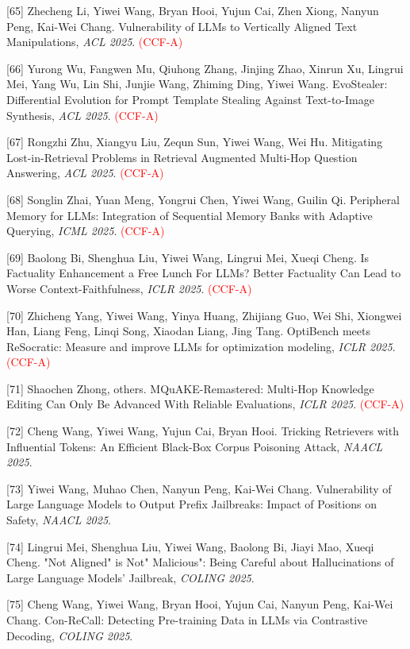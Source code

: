 [65] Zhecheng Li, Yiwei Wang, Bryan Hooi, Yujun Cai, Zhen Xiong, Nanyun Peng, Kai-Wei Chang. Vulnerability of LLMs to Vertically Aligned Text Manipulations, \textit{ACL 2025}. \textcolor{red}{(CCF-A)}

[66] Yurong Wu, Fangwen Mu, Qiuhong Zhang, Jinjing Zhao, Xinrun Xu, Lingrui Mei, Yang Wu, Lin Shi, Junjie Wang, Zhiming Ding, Yiwei Wang. EvoStealer: Differential Evolution for Prompt Template Stealing Against Text-to-Image Synthesis, \textit{ACL 2025}. \textcolor{red}{(CCF-A)}

[67] Rongzhi Zhu, Xiangyu Liu, Zequn Sun, Yiwei Wang, Wei Hu. Mitigating Lost-in-Retrieval Problems in Retrieval Augmented Multi-Hop Question Answering, \textit{ACL 2025}. \textcolor{red}{(CCF-A)}

[68] Songlin Zhai, Yuan Meng, Yongrui Chen, Yiwei Wang, Guilin Qi. Peripheral Memory for LLMs: Integration of Sequential Memory Banks with Adaptive Querying, \textit{ICML 2025}. \textcolor{red}{(CCF-A)}

[69] Baolong Bi, Shenghua Liu, Yiwei Wang, Lingrui Mei, Xueqi Cheng. Is Factuality Enhancement a Free Lunch For LLMs? Better Factuality Can Lead to Worse Context-Faithfulness, \textit{ICLR 2025}. \textcolor{red}{(CCF-A)}

[70] Zhicheng Yang, Yiwei Wang, Yinya Huang, Zhijiang Guo, Wei Shi, Xiongwei Han, Liang Feng, Linqi Song, Xiaodan Liang, Jing Tang. OptiBench meets ReSocratic: Measure and improve LLMs for optimization modeling, \textit{ICLR 2025}. \textcolor{red}{(CCF-A)}

[71] Shaochen Zhong, others. MQuAKE-Remastered: Multi-Hop Knowledge Editing Can Only Be Advanced With Reliable Evaluations, \textit{ICLR 2025}. \textcolor{red}{(CCF-A)}

[72] Cheng Wang, Yiwei Wang, Yujun Cai, Bryan Hooi. Tricking Retrievers with Influential Tokens: An Efficient Black-Box Corpus Poisoning Attack, \textit{NAACL 2025}.

[73] Yiwei Wang, Muhao Chen, Nanyun Peng, Kai-Wei Chang. Vulnerability of Large Language Models to Output Prefix Jailbreaks: Impact of Positions on Safety, \textit{NAACL 2025}.

[74] Lingrui Mei, Shenghua Liu, Yiwei Wang, Baolong Bi, Jiayi Mao, Xueqi Cheng. "Not Aligned" is Not" Malicious": Being Careful about Hallucinations of Large Language Models' Jailbreak, \textit{COLING 2025}.

[75] Cheng Wang, Yiwei Wang, Bryan Hooi, Yujun Cai, Nanyun Peng, Kai-Wei Chang. Con-ReCall: Detecting Pre-training Data in LLMs via Contrastive Decoding, \textit{COLING 2025}.

